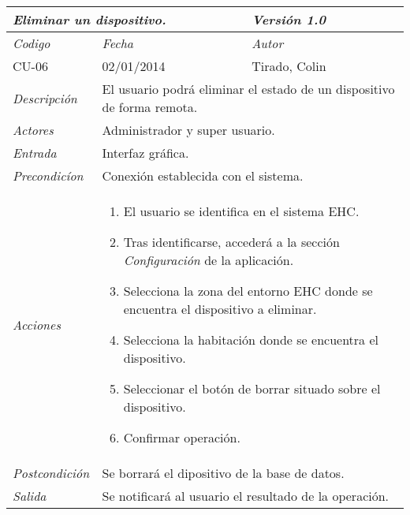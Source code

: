 \begin{center}
    \begin{tabular}{|p{3cm}|p{4cm}|p{4cm}|p{4cm}|}
    \hline \multicolumn{3}{|p{9cm}|}{\textit{Eliminar un dispositivo.}} & \textit{Versi\'on 1.0} \\
	\hline \textit{Codigo} & \textit{Fecha} & \multicolumn{2}{|p{6cm}|}{\textit{Autor}} \\
	CU-06 & 02/01/2014 & \multicolumn{2}{|p{6cm}|}{Tirado, Colin} \\		
    \hline \textit{Descripci\'on} & \multicolumn{3}{|p{9cm}|}{El usuario podr\'a eliminar el estado de un dispositivo de forma remota.} \\
    \hline \textit{Actores} & \multicolumn{3}{|p{9cm}|}{Administrador y super usuario.} \\
    \hline \textit{Entrada} & \multicolumn{3}{|p{9cm}|}{Interfaz gr\'afica.} \\
    \hline \textit{Precondic\'ion} & \multicolumn{3}{|p{9cm}|}{Conexi\'on establecida con el sistema.} \\
    \hline \textit{Acciones} & \multicolumn{3}{|p{9cm}|}{
        \begin{enumerate}
        \item El usuario se identifica en el sistema EHC.
        \item Tras identificarse, acceder\'a a la secci\'on \textit{Configuraci\'on} de la aplicaci\'on.
        \item Selecciona la zona del entorno EHC donde se encuentra el dispositivo a eliminar.
        \item Selecciona la habitaci\'on donde se encuentra el dispositivo.
        \item Seleccionar el bot\'on de borrar situado sobre el dispositivo.
        \item Confirmar operaci\'on.
        \end{enumerate}
           } \\
    \hline \textit{Postcondici\'on} & \multicolumn{3}{|p{9cm}|}{Se borrar\'a el dipositivo de la base de datos.} \\
    \hline \textit{Salida} & \multicolumn{3}{|p{9cm}|}{Se notificar\'a al usuario el resultado de la operaci\'on.} \\ \hline
    \end{tabular}
\end{center}